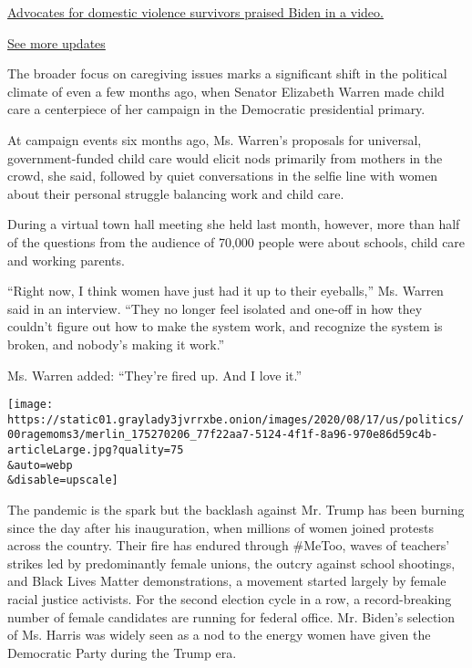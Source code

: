 \href{https://www.nytimes3xbfgragh.onion/live/2020/08/19/us/dnc-convention-election?action=click\&pgtype=Article\&state=default\&region=MAIN_CONTENT_1\&context=storylines_live_updates\#advocates-for-domestic-violence-survivors-praised-biden-in-a-video}{Advocates
for domestic violence survivors praised Biden in a video.}

\href{https://www.nytimes3xbfgragh.onion/live/2020/08/19/us/dnc-convention-election?action=click\&pgtype=Article\&state=default\&region=MAIN_CONTENT_1\&context=storylines_live_updates}{See
more updates}

The broader focus on caregiving issues marks a significant shift in the
political climate of even a few months ago, when Senator Elizabeth
Warren made child care a centerpiece of her campaign in the Democratic
presidential primary.

At campaign events six months ago, Ms. Warren's proposals for universal,
government-funded child care would elicit nods primarily from mothers in
the crowd, she said, followed by quiet conversations in the selfie line
with women about their personal struggle balancing work and child care.

During a virtual town hall meeting she held last month, however, more
than half of the questions from the audience of 70,000 people were about
schools, child care and working parents.

``Right now, I think women have just had it up to their eyeballs,'' Ms.
Warren said in an interview. ``They no longer feel isolated and one-off
in how they couldn't figure out how to make the system work, and
recognize the system is broken, and nobody's making it work.''

Ms. Warren added: ``They're fired up. And I love it.''

\texttt{[image: https://static01.graylady3jvrrxbe.onion/images/2020/08/17/us/politics/00ragemoms3/merlin\_175270206\_77f22aa7-5124-4f1f-8a96-970e86d59c4b-articleLarge.jpg?quality=75\\\&auto=webp\\\&disable=upscale]}

The pandemic is the spark but the backlash against Mr. Trump has been
burning since the day after his inauguration, when millions of women
joined protests across the country. Their fire has endured through
\#MeToo, waves of teachers' strikes led by predominantly female unions,
the outcry against school shootings, and Black Lives Matter
demonstrations, a movement started largely by female racial justice
activists. For the second election cycle in a row, a record-breaking
number of female candidates are running for federal office. Mr. Biden's
selection of Ms. Harris was widely seen as a nod to the energy women
have given the Democratic Party during the Trump era.


